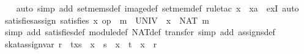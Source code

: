 \begin{isabellebody}
%
\isadelimproof
\ \ %
\endisadelimproof
%
\isatagproof
{}\isamarkupfalse%
\ {}auto\ simp\ add{}\ set{}mems{}def\ image{}def\ set{}mem{}def{}\ {}rule{}tac\ x\ {}\ xa\ \ exI{}\ auto{}%
\endisatagproof
{\isafoldproof}%
%
\isadelimproof
\isanewline
%
\endisadelimproof
\isanewline
{}\isamarkupfalse%
\ satisfies{}assign{}\ {}satisfies\ x\ {}op\ {}\ m{}\ {}\ UNIV\ {}\ x\ {}{}\ NAT\ m{}\isanewline
%
\isadelimproof
\ \ %
\endisadelimproof
%
\isatagproof
{}\isamarkupfalse%
\ {}simp\ add{}\ satisfies{}def\ module{}def\ NAT{}def{}\ transfer{}\ simp\ add{}\ assigns{}def{}%
\endisatagproof
{\isafoldproof}%
%
\isadelimproof
\isanewline
%
\endisadelimproof
\isanewline
{}\isamarkupfalse%
\ skat{}assign{}{}var{}\ {}r\ {}\ t{}x{}s{}\ {}\ {}x\ {}{}\ s\ {}\ x\ {}{}\ t{}\ {}\ {}x\ {}{}\ r{}{}\isanewline

\end{isabellebody}
